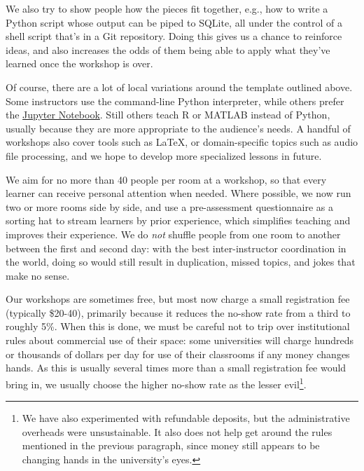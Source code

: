 \documentclass[10pt,a4paper,twocolumn]{article}
\begin{document}
We also try to show people how the pieces fit together, e.g., how to
write a Python script whose output can be piped to SQLite, all under
the control of a shell script that's in a Git repository. Doing this
gives us a chance to reinforce ideas, and also increases the odds of
them being able to apply what they've learned once the workshop is
over.

Of course, there are a lot of local variations around the template
outlined above. Some instructors use the command-line Python
interpreter, while others prefer the
\href{https://jupyter.org/}{Jupyter Notebook}.  Still others teach R
or MATLAB instead of Python, usually because they are more appropriate
to the audience's needs.  A handful of workshops also cover tools such
as LaTeX, or domain-specific topics such as audio file processing, and
we hope to develop more specialized lessons in future.

We aim for no more than 40 people per room at a workshop, so that
every learner can receive personal attention when needed.  Where
possible, we now run two or more rooms side by side, and use a
pre-assessment questionnaire as a sorting hat to stream learners by
prior experience, which simplifies teaching and improves their
experience.  We do \emph{not} shuffle people from one room to another
between the first and second day: with the best inter-instructor
coordination in the world, doing so would still result in duplication,
missed topics, and jokes that make no sense.

Our workshops are sometimes free, but most now charge a small
registration fee (typically \$20-40), primarily because it reduces the
no-show rate from a third to roughly 5\%.  When this is done, we must
be careful not to trip over institutional rules about commercial use
of their space: some universities will charge hundreds or thousands of
dollars per day for use of their classrooms if any money changes
hands.  As this is usually several times more than a small
registration fee would bring in, we usually choose the higher no-show
rate as the lesser evil\footnote{We have also experimented with
  refundable deposits, but the administrative overheads were
  unsustainable.  It also does not help get around the rules mentioned
  in the previous paragraph, since money still appears to be changing
  hands in the university's eyes.}.
\end{document}
